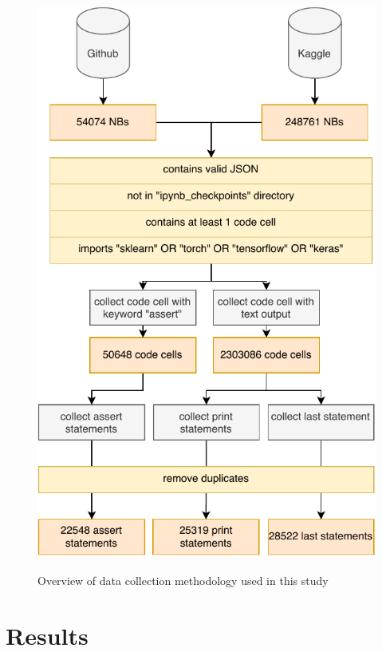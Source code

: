 \begin{figure}
  \centering
  \includegraphics[width=\linewidth]{esem24-method.pdf}
  \label{fig:data-collection}
  \caption{Overview of data collection methodology used in this study}
\end{figure}

\section{Results}


